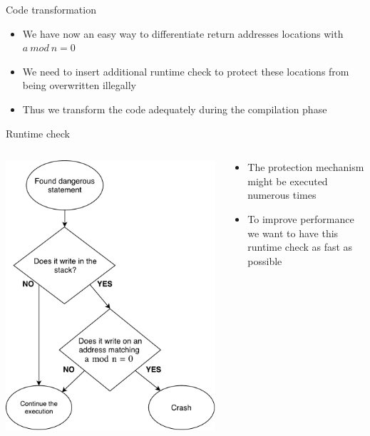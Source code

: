 \documentclass{beamer}
\begin{document}
\begin{frame}[c]{Code transformation}
	\begin{itemize}\itemsep20pt
		\item We have now an easy way to differentiate return addresses locations with $a~mod~n=0$
		\item We need to insert additional runtime check to protect these locations from being overwritten illegally
		\item Thus we transform the code adequately during the compilation phase
	\end{itemize}
\end{frame}

\begin{frame}[c]{Runtime check}
	\begin{columns}
		\begin{column}{0.5\textwidth}
   			\includegraphics[height=0.85\textheight]{images/runtime_check.pdf}
		\end{column}
		\begin{column}{0.5\textwidth}
			\begin{itemize}
				\item The protection mechanism might be executed numerous times
				\item To improve performance we want to have this runtime check as fast as possible
			\end{itemize}
		\end{column}
	\end{columns}
\end{frame}
\end{document}
